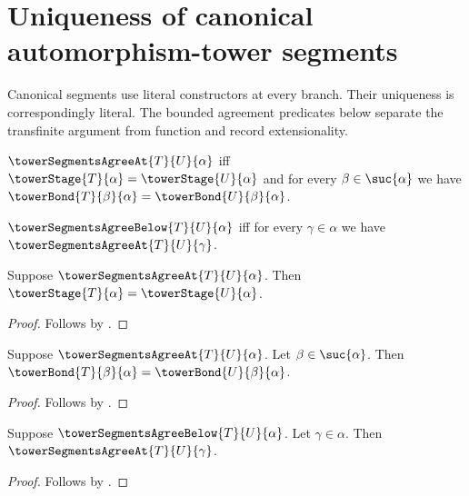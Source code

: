 

\section{Uniqueness of canonical automorphism-tower segments}

Canonical segments use literal constructors at every branch.  Their
uniqueness is correspondingly literal.  The bounded agreement predicates
below separate the transfinite argument from function and record
extensionality.

\begin{definition}\label{tower_segments_agree_at}
    $\towerSegmentsAgreeAt{T}{U}{\alpha}$ iff
        $\towerStage{T}{\alpha}=\towerStage{U}{\alpha}$ and
        for every $\beta\in\suc{\alpha}$ we have
            $\towerBond{T}{\beta}{\alpha}=
                \towerBond{U}{\beta}{\alpha}$.
\end{definition}

\begin{definition}\label{tower_segments_agree_below}
    $\towerSegmentsAgreeBelow{T}{U}{\alpha}$ iff
        for every $\gamma\in\alpha$ we have
            $\towerSegmentsAgreeAt{T}{U}{\gamma}$.
\end{definition}

\begin{proposition}\label{tower_segments_agree_at_stage}
    Suppose $\towerSegmentsAgreeAt{T}{U}{\alpha}$.
    Then $\towerStage{T}{\alpha}=\towerStage{U}{\alpha}$.
\end{proposition}
\begin{proof}
    Follows by .
\end{proof}

\begin{proposition}\label{tower_segments_agree_at_bond}
    Suppose $\towerSegmentsAgreeAt{T}{U}{\alpha}$.
    Let $\beta\in\suc{\alpha}$.
    Then $\towerBond{T}{\beta}{\alpha}=
        \towerBond{U}{\beta}{\alpha}$.
\end{proposition}
\begin{proof}
    Follows by .
\end{proof}

\begin{proposition}\label{tower_segments_agree_below_at}
    Suppose $\towerSegmentsAgreeBelow{T}{U}{\alpha}$.
    Let $\gamma\in\alpha$.
    Then $\towerSegmentsAgreeAt{T}{U}{\gamma}$.
\end{proposition}
\begin{proof}
    Follows by .
\end{proof}

